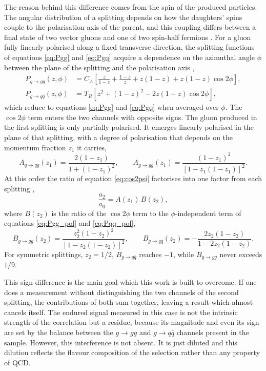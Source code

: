 The reason behind this difference comes from the spin of the produced particles.
The angular distribution of a splitting depends on how the daughters' spins couple to the
polarisation axis of the parent, and this coupling differs between a final state
of two vector gluons and one of two spin-half fermions \cite{Karlberg_2021}. For a gluon fully linearly polarised along a fixed transverse
direction, the splitting functions of equations \eqref{eq:Pgg} and \eqref{eq:Pgq}
acquire a dependence on the azimuthal angle $\phi$ between the
plane of the splitting and the polarisation axis \cite{Karlberg_2021},
\begin{align}
  P_{g\to gg}(z,\phi) &= C_A\left[\frac{z}{1-z}+\frac{1-z}{z}
    +z(1-z)+z(1-z)\cos 2\phi\right],
    \label{eq:Pgg_pol}\\
  P_{g\to q\bar{q}}(z,\phi) &= T_R\left[z^2+(1-z)^2
    -2z(1-z)\cos 2\phi\right],
    \label{eq:Pqq_pol}
\end{align}
which reduce to equations \eqref{eq:Pgg} and \eqref{eq:Pgq} when averaged over $\phi$.
The $\cos 2\phi$ term enters the two channels with opposite
signs. The gluon produced in the first splitting is only
partially polarised. It emerges linearly polarised in the plane
of that splitting, with a degree of polarisation that depends on
the momentum fraction $z_1$ it carries,
\begin{equation}
  A_{q\to qg}(z_1) = \frac{2(1-z_1)}{1+(1-z_1)^2},
  \qquad
  A_{g\to gg}(z_1) = \frac{(1-z_1)^2}
                          {\left[1-z_1(1-z_1)\right]^2}.
  \label{eq:A_pol}
\end{equation}
At this order the ratio of equation \eqref{eq:cos2psi} factorises into one
factor from each splitting \cite{Karlberg_2021},
\begin{equation}
  \frac{a_2}{a_0} = A(z_1)\,B(z_2),
  \label{eq:a2a0_AB}
\end{equation}
where $B(z_2)$ is the ratio of the $\cos 2\phi$ term to the
$\phi$-independent term of equations \eqref{eq:Pgg_pol} and
\eqref{eq:Pqq_pol},
\begin{equation}
  B_{g\to gg}(z_2) = \frac{z_2^2(1-z_2)^2}
                          {\left[1-z_2(1-z_2)\right]^2},
  \qquad
  B_{g\to q\bar{q}}(z_2) = -\frac{2z_2(1-z_2)}
                                 {1-2z_2(1-z_2)}.
  \label{eq:B_pol}
\end{equation}
For symmetric splittings, $z_2=1/2$, $B_{g\to q\bar{q}}$ reaches
$-1$, while $B_{g\to gg}$ never exceeds $1/9$.

This sign difference is the main goal which this work is built to overcome.
If one does a measurement without distinguishing the two channels of the 
second splitting, the contributions of both sum together, leaving a result
which almost cancels itself. The endured signal measured in this case is not
the intrinsic strength of the correlation but a residue, because its magnitude
and even its sign are set by the balance between the $g \to gg$ and $g \to q\bar{q}$ 
channels present in the sample. However, this interference is not absent. It is just
diluted and this dilution reflects the flavour composition of the selection rather than any
property of QCD.


